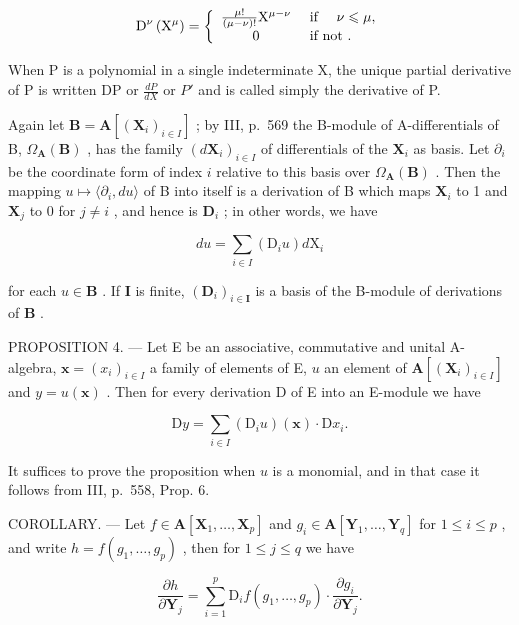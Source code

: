 \[
\mathrm{D} ^ {\nu} \left(\mathrm{X} ^ {\mu}\right) = \left\{ \begin{array}{c l} \frac {\mu !}{(\mu - \nu) !} \mathrm{X} ^ {\mu - \nu} & \text { if } \quad \nu \leqslant \mu , \\ 0 & \text { if   not }. \end{array} \right.
\]

When P is a polynomial in a single indeterminate X, the unique partial derivative of P is written DP or \(\frac{dP}{dX}\) or \(P'\) and is called simply the derivative of P.

Again let \(\mathbf{B} = \mathbf{A}\left[(\mathbf{X}_i)_{i\in I}\right]\) ; by III, p.~569 the B-module of A-differentials of B, \(\Omega_{\mathbf{A}}(\mathbf{B})\) , has the family \((d\mathbf{X}_i)_{i\in I}\) of differentials of the \(\mathbf{X}_i\) as basis. Let \(\partial_i\) be the coordinate form of index \(i\) relative to this basis over \(\Omega_{\mathbf{A}}(\mathbf{B})\) . Then the mapping \(u\mapsto \langle \partial_i,du\rangle\) of B into itself is a derivation of B which maps \(\mathbf{X}_i\) to 1 and \(\mathbf{X}_j\) to 0 for \(j\neq i\) , and hence is \(\mathbf{D}_i\) ; in other words, we have

\[
d u = \sum_ {i \in I} \left(\mathrm{D} _ {i} u\right) d \mathrm{X} _ {i}\tag{7}
\]

for each \(u \in \mathbf{B}\) . If \(\mathbf{I}\) is finite, \((\mathbf{D}_i)_{i \in \mathbf{I}}\) is a basis of the B-module of derivations of \(\mathbf{B}\) .

PROPOSITION 4. --- Let E be an associative, commutative and unital A-algebra, \(\mathbf{x} = (x_i)_{i\in I}\) a family of elements of E, \(u\) an element of \(\mathbf{A}[(\mathbf{X}_i)_{i\in I}]\) and \(y = u(\mathbf{x})\) . Then for every derivation D of E into an E-module we have

\[
\mathrm{D} y = \sum_ {i \in I} \left(\mathrm{D} _ {i} u\right) (\mathbf {x}) \cdot \mathrm{D} x _ {i}.
\]

It suffices to prove the proposition when \(u\) is a monomial, and in that case it follows from III, p.~558, Prop. 6.

COROLLARY. --- Let \(f \in \mathbf{A}[\mathbf{X}_1, \ldots, \mathbf{X}_p]\) and \(g_i \in \mathbf{A}[\mathbf{Y}_1, \ldots, \mathbf{Y}_q]\) for \(1 \leqslant i \leqslant p\) , and write \(h = f(g_1, \ldots, g_p)\) , then for \(1 \leqslant j \leqslant q\) we have

\[
\frac {\partial h}{\partial \mathbf {Y} _ {j}} = \sum_ {i = 1} ^ {p} \mathrm{D} _ {i} f (g _ {1}, \dots , g _ {p}) \cdot \frac {\partial g _ {i}}{\partial \mathbf {Y} _ {j}}.\tag{8}
\]


